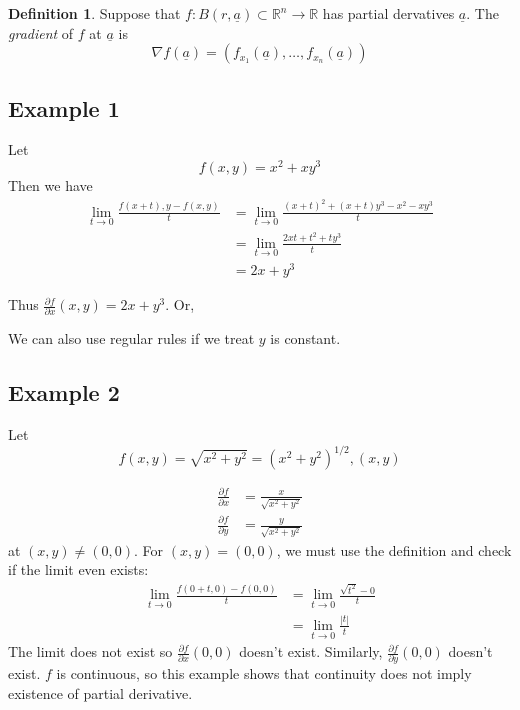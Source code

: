 \documentclass[12pt]{article}
\theoremstyle{definition}
\newtheorem{definition}{Definition}[section]
\newcommand{\R}{\mathbb{R}}
\begin{document}
\begin{definition}
    Suppose that $f:B(r,\underline a)\subset \R^n\to \R$ has partial dervatives $\underline a$. The \textit{gradient} of $f$ at $\underline a$ is \[\nabla f(\underline a)=(f_{x_1}(\underline a),\dots, f_{x_n}(\underline a))\]
\end{definition}

\subsection{Example 1}
Let \[f(x,y)=x^2+xy^3\] Then we have
\begin{align*}
    \lim_{t\to 0}\frac{f(x+t), y-f(x,y)}{t}&=\lim_{t\to 0}\frac{(x+t)^2+(x+t)y^3-x^2-xy^3}{t}\\
    &=\lim_{t\to 0}\frac{2xt+t^2+ty^3}{t}\\
    &=2x+y^3
\end{align*}

Thus $\frac{\partial f}{\partial x}(x,y)=2x+y^3$. Or,

We can also use regular rules if we treat $y$ is constant.

\subsection{Example 2}
Let \[f(x,y)=\sqrt{x^2+y^2}=(x^2+y^2)^{1/2}, (x,y)\]

\begin{align*}
    \frac{\partial f}{\partial x}&=\frac{x}{\sqrt{x^2+y^2}}\\
    \frac{\partial f}{\partial y}&=\frac{y}{\sqrt{x^2+y^2}}
\end{align*}
at $(x,y)\neq(0,0)$. For $(x,y)=(0,0)$, we must use the definition and check if the limit even exists:
\begin{align*}
    \lim_{t\to 0}\frac{f(0+t, 0)-f(0,0)}{t}&=\lim_{t\to 0}\frac{\sqrt{t^2}-0}{t}\\
    &=\lim_{t\to 0}\frac{|t|}{t}
\end{align*}
The limit does not exist so $\frac{\partial f}{\partial x}(0,0)$ doesn't exist. Similarly, $\frac{\partial f}{\partial y}(0,0)$ doesn't exist. $f$ is continuous, so this example shows that continuity does not imply existence of partial derivative.
\end{document}
